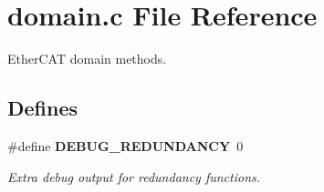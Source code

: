 \section{domain.\-c \-File \-Reference}
\label{domain_8c}


\-Ether\-C\-A\-T domain methods.  


\subsection*{\-Defines}
\begin{DoxyCompactItemize}
\item 
\#define {\bf \-D\-E\-B\-U\-G\-\_\-\-R\-E\-D\-U\-N\-D\-A\-N\-C\-Y}~0\label{domain_8c_a06f1befc7d03dbef13e823d26863aec4}

\begin{DoxyCompactList}\small\item\em \-Extra debug output for redundancy functions. \end{DoxyCompactList}\end{DoxyCompactItemize}
